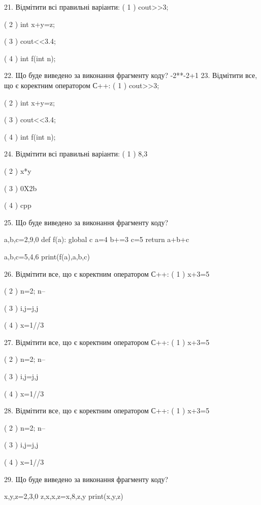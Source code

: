 \documentclass[11pt]{article}
\begin{document}
21. Відмітити всі правильні варіанти:
( 1 ) cout>>3;

( 2 ) int x+y=z;

( 3 ) cout<<3.4;

( 4 ) int f(int n);

22. Що буде виведено за виконання фрагменту коду?
-2**-2+1
23. Відмітити все, що є коректним оператором С++:
( 1 ) cout>>3;

( 2 ) int x+y=z;

( 3 ) cout<<3.4;

( 4 ) int f(int n);

24. Відмітити всі правильні варіанти:
( 1 ) 8,3

( 2 ) x*y

( 3 ) 0X2b

( 4 ) cpp

25. Що буде виведено за виконання фрагменту коду?

a,b,c=2,9,0
def f(a):
global c    a=4
    b+=3
    c=5
    return a+b+c

a,b,c=5,4,6
print(f(a),a,b,c)

26. Відмітити все, що є коректним оператором С++:
( 1 ) x+3=5

( 2 ) n=2; n--

( 3 ) i,j=j,j

( 4 ) x=1//3

27. Відмітити все, що є коректним оператором С++:
( 1 ) x+3=5

( 2 ) n=2; n--

( 3 ) i,j=j,j

( 4 ) x=1//3

28. Відмітити все, що є коректним оператором С++:
( 1 ) x+3=5

( 2 ) n=2; n--

( 3 ) i,j=j,j

( 4 ) x=1//3

29. Що буде виведено за виконання фрагменту коду?

x,y,z=2,3,0
z,x,x,z=x,8,z,y
print(x,y,z)
\end{document}
